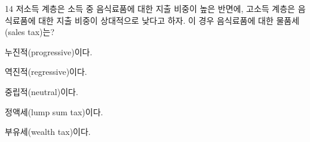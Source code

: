 \begin{question}{14}
저소득 계층은 소득 중 음식료품에 대한 지출 비중이 높은 반면에, 고소득 계층은 음식료품에 대한 지출 비중이 상대적으로 낮다고 하자. 이 경우 음식료품에 대한 물품세(sales tax)는?
\begin{choices}
  \item 누진적(progressive)이다.
  \item 역진적(regressive)이다.
  \item 중립적(neutral)이다.
  \item 정액세(lump sum tax)이다.
  \item 부유세(wealth tax)이다.
\end{choices}
\end{question}

